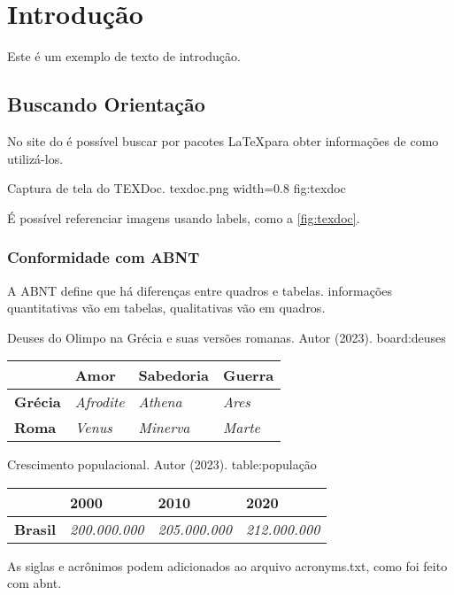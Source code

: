 \section{Introdução}

Este é um exemplo de texto de introdução.

\subsection{Buscando Orientação}

No site do \textcite{texdoc_2023} é possível buscar por pacotes \LaTeX para obter informações de como utilizá-los.

\ABNTfigure
{Captura de tela do TEXDoc.}
{\textcite{texdoc_2023}}
{texdoc.png}
{width=0.8\textwidth}
{fig:texdoc}

É possível referenciar imagens usando labels, como a \ref{fig:texdoc}.

\subsubsection{Conformidade com ABNT}

A ABNT define que há diferenças entre quadros e tabelas.
informações quantitativas vão em tabelas, qualitativas vão em quadros.

\ABNTboard
{Deuses do Olimpo na Grécia e suas versões romanas.}
{Autor (2023).}
{board:deuses}
{
    \begin{tabular}{|l|l|l|l|}
        \hline
                        & \textbf{Amor}     & \textbf{Sabedoria} & \textbf{Guerra} \\ \hline
        \textbf{Grécia} & \textit{Afrodite} & \textit{Athena}    & \textit{Ares}   \\ \hline
        \textbf{Roma}   & \textit{Venus}    & \textit{Minerva}   & \textit{Marte}  \\ \hline
    \end{tabular}
}


\ABNTtable
{Crescimento populacional.}
{Autor (2023).}
{table:população}
{
    \begin{tabular}{llll}
        \hline
                        & \textbf{2000}        & \textbf{2010}        & \textbf{2020}        \\ \hline
        \textbf{Brasil} & \textit{200.000.000} & \textit{205.000.000} & \textit{212.000.000} \\ \hline
    \end{tabular}
}

As siglas e acrônimos podem adicionados ao arquivo acronyms.txt, como foi feito com \ac{abnt}.

